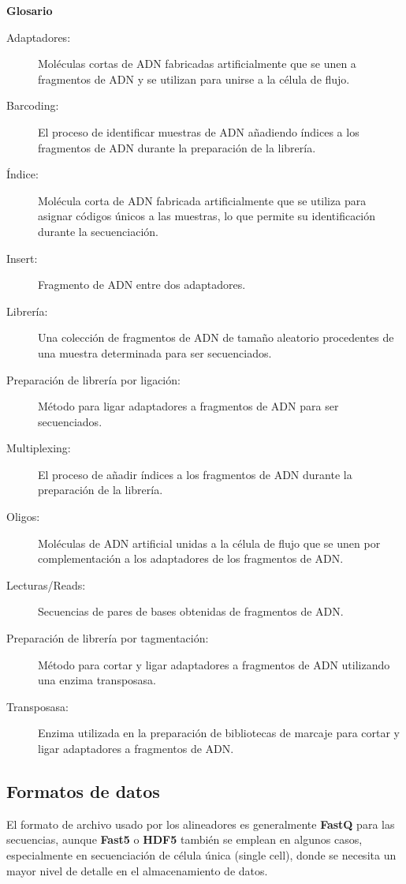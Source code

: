 \begin{table}[htbp]
\begin{mdframed}[backgroundcolor=black!10]
    \centering
\textbf{Glosario}
\begin{description}
\item[Adaptadores:] Moléculas cortas de ADN fabricadas artificialmente que se unen a fragmentos de ADN y se utilizan para unirse a la célula de flujo.
\item[Barcoding:] El proceso de identificar muestras de ADN añadiendo índices a los fragmentos de ADN durante la preparación de la librería.
\item[Índice:] Molécula corta de ADN fabricada artificialmente que se utiliza para asignar códigos únicos a las muestras, lo que permite su identificación durante la secuenciación.
\item[Insert:] Fragmento de ADN entre dos adaptadores.
\item[Librería:] Una colección de fragmentos de ADN de tamaño aleatorio procedentes de una muestra determinada para ser secuenciados.
\item[Preparación de librería por ligación:] Método para ligar adaptadores a fragmentos de ADN para ser secuenciados.
\item[Multiplexing:] El proceso de añadir índices a los fragmentos de ADN durante la preparación de la librería.
\item[Oligos:] Moléculas de ADN artificial unidas a la célula de flujo que se unen por complementación a los adaptadores de los fragmentos de ADN.
\item[Lecturas/Reads:] Secuencias de pares de bases obtenidas de fragmentos de ADN.
\item[Preparación de librería por tagmentación:] Método para cortar y ligar adaptadores a fragmentos de ADN utilizando una enzima transposasa.
\item[Transposasa:] Enzima utilizada en la preparación de bibliotecas de marcaje para cortar y ligar adaptadores a fragmentos de ADN.
\end{description}
    \end{mdframed}
\end{table}

\subsection{Formatos de datos}
El formato de archivo usado por los alineadores es generalmente \textbf{FastQ} para las secuencias, aunque \textbf{Fast5} o \textbf{HDF5} también se emplean en algunos casos, especialmente en secuenciación de célula única (single cell), donde se necesita un mayor nivel de detalle en el almacenamiento de datos.

